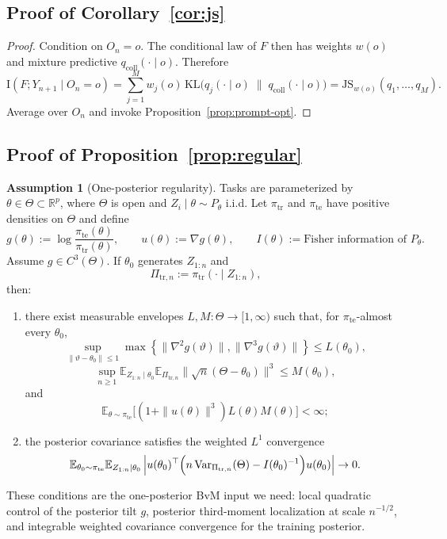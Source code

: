 \documentclass{article}
\theoremstyle{definition}
\newtheorem{assumption}[theorem]{Assumption}
\theoremstyle{remark}
\newcommand{\E}{\mathbb{E}}
\newcommand{\KL}{\mathrm{KL}}
\newcommand{\I}{\mathrm{I}}
\newcommand{\JS}{\mathrm{JS}}
\newcommand{\Var}{\mathrm{Var}}
\newcommand{\Rbb}{\mathbb{R}}
\newcommand{\tr}{\mathrm{tr}}
\newcommand{\te}{\mathrm{te}}
\begin{document}
\subsection{Proof of Corollary~\ref{cor:js}}

\begin{proof}
Condition on $O_n=o$. The conditional law of $F$ then has weights $w(o)$ and mixture predictive $q_{\mathrm{coll}}(\cdot\mid o)$. Therefore
\[
\I(F;Y_{n+1}\mid O_n=o)
=
\sum_{j=1}^M w_j(o)\,
\KL\bigl(
q_j(\cdot\mid o)
\;\|\;
q_{\mathrm{coll}}(\cdot\mid o)
\bigr)
=
\JS_{w(o)}(q_1,\dots,q_M).
\]
Average over $O_n$ and invoke Proposition~\ref{prop:prompt-opt}.
\end{proof}

\subsection{Proof of Proposition~\ref{prop:regular}}
\label{app:regular-proofs}

\begin{assumption}[One-posterior regularity]
\label{ass:bvm}
Tasks are parameterized by $\theta\in\Theta\subset\Rbb^p$, where $\Theta$ is open and $Z_i\mid \theta \sim P_\theta$ i.i.d. Let $\pi_{\tr}$ and $\pi_{\te}$ have positive densities on $\Theta$ and define
\[
g(\theta):=\log \frac{\pi_{\te}(\theta)}{\pi_{\tr}(\theta)},
\qquad
u(\theta):=\nabla g(\theta),
\qquad
I(\theta):=\text{Fisher information of }P_\theta.
\]
Assume $g\in C^3(\Theta)$. If $\theta_0$ generates $Z_{1:n}$ and
\[
\Pi_{\tr,n}:=\pi_{\tr}(\cdot\mid Z_{1:n}),
\]
then:
\begin{enumerate}[leftmargin=18pt]
\item there exist measurable envelopes $L,M:\Theta\to[1,\infty)$ such that, for $\pi_{\te}$-almost every $\theta_0$,
\[
\sup_{\|\vartheta-\theta_0\|\le 1}
\max\!\left\{
\|\nabla^2 g(\vartheta)\|,
\|\nabla^3 g(\vartheta)\|
\right\}
\le
L(\theta_0),
\]
\[
\sup_{n\ge 1}
\E_{Z_{1:n}\mid \theta_0}
\E_{\Pi_{\tr,n}}
\|\sqrt n(\Theta-\theta_0)\|^3
\le
M(\theta_0),
\]
and
\[
\E_{\theta\sim\pi_{\te}}
\bigl[(1+\|u(\theta)\|^3)L(\theta)M(\theta)\bigr]
<\infty;
\]
\item the posterior covariance satisfies the weighted $L^1$ convergence
\[
\E_{\theta_0\sim\pi_{\te}}
\E_{Z_{1:n}\mid \theta_0}
\left|
u(\theta_0)^\top
\Bigl(
n\,\Var_{\Pi_{\tr,n}}(\Theta)-I(\theta_0)^{-1}
\Bigr)
u(\theta_0)
\right|
\to 0.
\]
\end{enumerate}
These conditions are the one-posterior BvM input we need: local quadratic control of the posterior tilt $g$, posterior third-moment localization at scale $n^{-1/2}$, and integrable weighted covariance convergence for the training posterior.
\end{assumption}
\end{document}
